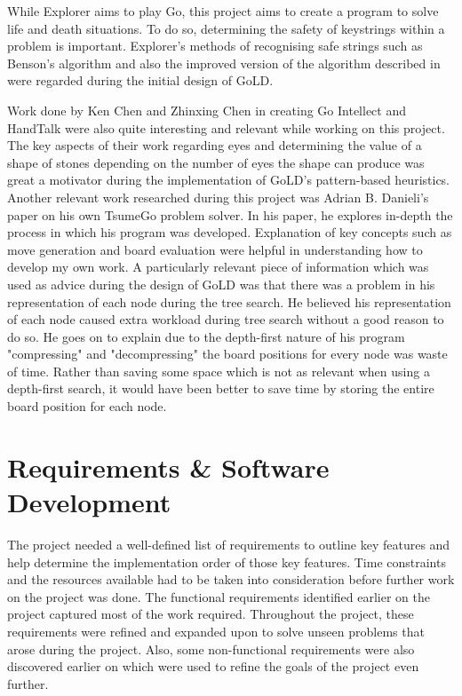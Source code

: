 \documentclass{l4proj}
\begin{document}
While Explorer aims to play Go, this project aims to create a program to solve life and death situations. To do so, determining the safety of keystrings within a problem is important. Explorer's methods of recognising safe strings such as Benson's algorithm \cite{Benson1976} and also the improved version of the algorithm described in \cite{Muller1998} were regarded during the initial design of GoLD.

Work done by Ken Chen and Zhinxing Chen \cite{Chen1999} in creating Go Intellect and HandTalk were also quite interesting and relevant while working on this project. The key aspects of their work regarding eyes and determining the value of a shape of stones depending on the number of eyes the shape can produce was great a motivator during the implementation of GoLD's pattern-based heuristics.
Another relevant work researched during this project was Adrian B. Danieli's paper \cite{Adrian2010} on his own TsumeGo problem solver. In his paper, he explores in-depth the process in which his program was developed. Explanation of key concepts such as move generation and board evaluation were helpful in understanding how to develop my own work. A particularly relevant piece of information which was used as advice during the design of GoLD was that there was a problem in his representation of each node during the tree search. He believed his representation of each node caused extra workload during tree search without a good reason to do so. He goes on to explain due to the depth-first nature of his program "compressing" and "decompressing" the board positions for every node was waste of time. Rather than saving some space which is not as relevant when using a depth-first search, it would have been better to save time by storing the entire board position for each node.







\chapter{Requirements \& Software Development}

The project needed a well-defined list of requirements to outline key features and help determine the implementation order of those key features. Time constraints and the resources available had to be taken into consideration before further work on the project was done. The functional requirements identified earlier on the project captured most of the work required. Throughout the project, these requirements were refined and expanded upon to solve unseen problems that arose during the project. Also, some non-functional requirements were also discovered earlier on which were used to refine the goals of the project even further.
\end{document}
